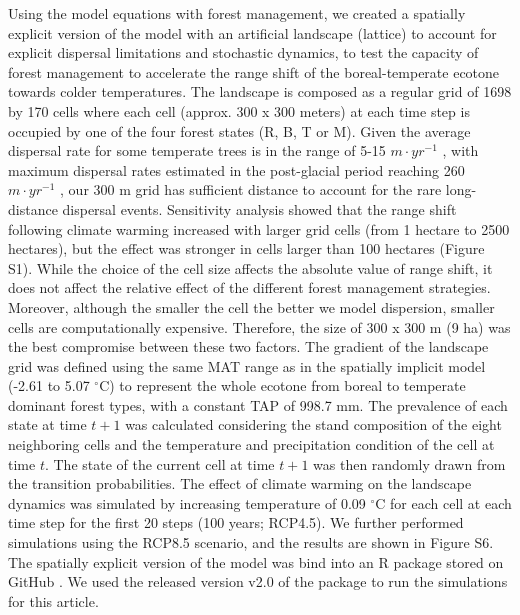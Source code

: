 Using the model equations with forest management, we created a spatially
explicit version of the model with an artificial landscape (lattice) to
account for explicit dispersal limitations and stochastic dynamics, to
test the capacity of forest management to accelerate the range shift of
the boreal-temperate ecotone towards colder temperatures. The landscape
is composed as a regular grid of 1698 by 170 cells where each cell
(approx. 300 x 300 meters) at each time step is occupied by one of the
four forest states (R, B, T or M). Given the average dispersal rate for
some temperate trees is in the range of 5-15 \(m \cdot yr^{-1}\)
\citep{Ribbens1994}, with maximum dispersal rates estimated in the
post-glacial period reaching 260 \(m \cdot yr^{-1}\)
\citep{Feurdean2013}, our 300 m grid has sufficient distance to account
for the rare long-distance dispersal events. Sensitivity analysis showed
that the range shift following climate warming increased with larger
grid cells (from 1 hectare to 2500 hectares), but the effect was
stronger in cells larger than 100 hectares (Figure S1). While the choice
of the cell size affects the absolute value of range shift, it does not
affect the relative effect of the different forest management
strategies. Moreover, although the smaller the cell the better we model
dispersion, smaller cells are computationally expensive. Therefore, the
size of 300 x 300 m (9 ha) was the best compromise between these two
factors. The gradient of the landscape grid was defined using the same
MAT range as in the spatially implicit model (-2.61 to 5.07
\(^{\circ}\)C) to represent the whole ecotone from boreal to temperate
dominant forest types, with a constant TAP of 998.7 mm. The prevalence
of each state at time \(t + 1\) was calculated considering the stand
composition of the eight neighboring cells and the temperature and
precipitation condition of the cell at time \(t\). The state of the
current cell at time \(t + 1\) was then randomly drawn from the
transition probabilities. The effect of climate warming on the landscape
dynamics was simulated by increasing temperature of 0.09 \(^{\circ}\)C
for each cell at each time step for the first 20 steps (100 years;
RCP4.5). We further performed simulations using the RCP8.5 scenario, and
the results are shown in Figure S6. The spatially explicit version of
the model was bind into an R package stored on GitHub
\citep{STManaged2020}. We used the released version v2.0 of the package
to run the simulations for this article.

